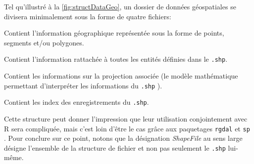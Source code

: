 
Tel qu'illustré à la \autoref{fig:structDataGeo}, un dossier de données géospatiales se divisera minimalement sous la forme de quatre fichiers:
\begin{description}[style=multiline,leftmargin=1.5cm]
	\item[\texttt{.shp}] Contient l'information géographique représentée sous la forme de points, segments et/ou polygones.
	\item[\texttt{.dbf}] Contient l'information rattachée à toutes les entités définies dans le \texttt{.shp}.
	\item[\texttt{.prj}] Contient les informations sur la projection associée (le modèle mathématique permettant d'interpréter les informations du \texttt{.shp} \cite{projectionSIG}).
	\item[{.shx}] Contient les index des enregistrements du \texttt{.shp}.
\end{description}
Cette structure peut donner l'impression que leur utilisation conjointement avec R sera compliquée, mais c'est loin d'être le cas grâce aux paquetages \texttt{rgdal} \cite{Rpackage:rgdal} et \texttt{sp}\cite{Rpackage:sp} . Pour conclure sur ce point, notons que la désignation \emph{ShapeFile} au sens large désigne l'ensemble de la structure de fichier et non pas seulement le \texttt{.shp} lui-même. \cite{portailSIG} \\

